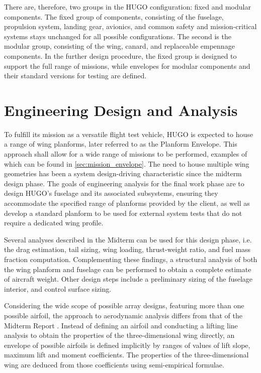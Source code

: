 There are, therefore, two groups in the HUGO configuration: fixed and modular components. The fixed group of components, consisting of the fuselage, propulsion system, landing gear, avionics, and common safety and mission-critical systems stays unchanged for all possible configurations. The second is the modular group, consisting of the wing, canard, and replaceable empennage components. In the further design procedure, the fixed group is designed to support the full range of missions, while envelopes for modular components and their standard versions for testing are defined.

\section{Engineering Design and Analysis}
\label{sec:engineering_design_and_analysis}

To fulfill its mission as a versatile flight test vehicle, HUGO is expected to house a range of wing planforms, later referred to as the Planform Envelope. This approach shall allow
for a wide range of missions to be performed, examples of which can be found in \autoref{sec:mission_envelope}. The need to house multiple wing geometries has been a system design-driving characteristic since the midterm design phase. The goals of engineering analysis for the final work phase are to design HUGO's fuselage and its associated subsystems, ensuring they accommodate the specified range of planforms provided by the client, as well as develop a standard planform to be used for external system tests that do not require a dedicated wing profile.

Several analyses described in the Midterm  can be used for this design phase, i.e. the drag estimation, tail sizing, wing loading, thrust-weight ratio, and fuel mass fraction computation. Complementing these findings, a structural analysis of both the wing planform and fuselage can be performed to obtain a complete estimate of aircraft weight. Other design steps include a preliminary sizing of the fuselage interior, and control surface sizing.

Considering the wide scope of possible array designs, featuring more than one possible airfoil, the approach to aerodynamic analysis differs from that of the Midterm Report .
Instead of defining an airfoil and conducting a lifting line analysis to obtain the properties of the three-dimensional wing directly, an envelope of possible airfoils is defined implicitly by ranges of values of lift slope, maximum lift and moment coefficients. The properties of the three-dimensional wing are deduced from those coefficients using semi-empirical formulae.

